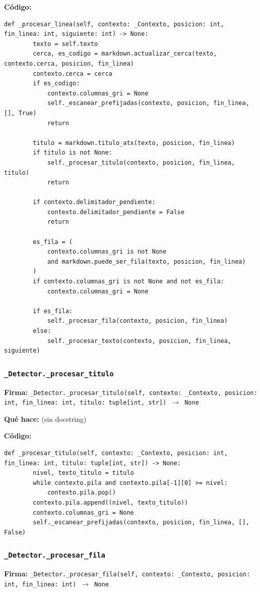 \documentclass[11pt,a4paper]{article}
\begin{document}
\textbf{Código:}
\begin{lstlisting}
def _procesar_linea(self, contexto: _Contexto, posicion: int, fin_linea: int, siguiente: int) -> None:
        texto = self.texto
        cerca, es_codigo = markdown.actualizar_cerca(texto, contexto.cerca, posicion, fin_linea)
        contexto.cerca = cerca
        if es_codigo:
            contexto.columnas_gri = None
            self._escanear_prefijadas(contexto, posicion, fin_linea, [], True)
            return

        titulo = markdown.titulo_atx(texto, posicion, fin_linea)
        if titulo is not None:
            self._procesar_titulo(contexto, posicion, fin_linea, titulo)
            return

        if contexto.delimitador_pendiente:
            contexto.delimitador_pendiente = False
            return

        es_fila = (
            contexto.columnas_gri is not None
            and markdown.puede_ser_fila(texto, posicion, fin_linea)
        )
        if contexto.columnas_gri is not None and not es_fila:
            contexto.columnas_gri = None

        if es_fila:
            self._procesar_fila(contexto, posicion, fin_linea)
        else:
            self._procesar_texto(contexto, posicion, fin_linea, siguiente)
\end{lstlisting}

\subsubsection*{\texttt{\_Detector.\_procesar\_titulo}}
\textbf{Firma:} \texttt{\_Detector.\_procesar\_titulo(self, contexto: \_Contexto, posicion: int, fin\_linea: int, titulo: tuple[int, str]) $\rightarrow$ None}

\textbf{Qué hace:} (sin docstring)

\textbf{Código:}
\begin{lstlisting}
def _procesar_titulo(self, contexto: _Contexto, posicion: int, fin_linea: int, titulo: tuple[int, str]) -> None:
        nivel, texto_titulo = titulo
        while contexto.pila and contexto.pila[-1][0] >= nivel:
            contexto.pila.pop()
        contexto.pila.append((nivel, texto_titulo))
        contexto.columnas_gri = None
        self._escanear_prefijadas(contexto, posicion, fin_linea, [], False)
\end{lstlisting}

\subsubsection*{\texttt{\_Detector.\_procesar\_fila}}
\textbf{Firma:} \texttt{\_Detector.\_procesar\_fila(self, contexto: \_Contexto, posicion: int, fin\_linea: int) $\rightarrow$ None}
\end{document}

